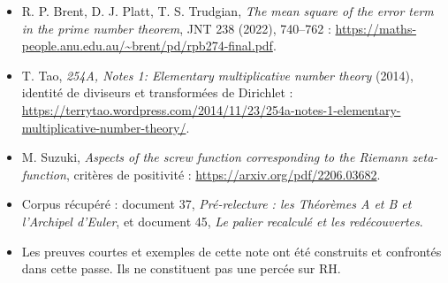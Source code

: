 \documentclass[
  11pt,
]{article}
\providecommand{\tightlist}{%
  \setlength{\itemsep}{0pt}\setlength{\parskip}{0pt}}
\begin{document}
\begin{itemize}
\tightlist
\item
  R. P. Brent, D. J. Platt, T. S. Trudgian, \emph{The mean square of the
  error term in the prime number theorem}, JNT 238 (2022), 740--762 :
  \url{https://maths-people.anu.edu.au/~brent/pd/rpb274-final.pdf}.
\item
  T. Tao, \emph{254A, Notes 1: Elementary multiplicative number theory}
  (2014), identité de diviseurs et transformées de Dirichlet :
  \url{https://terrytao.wordpress.com/2014/11/23/254a-notes-1-elementary-multiplicative-number-theory/}.
\item
  M. Suzuki, \emph{Aspects of the screw function corresponding to the
  Riemann zeta-function}, critères de positivité :
  \url{https://arxiv.org/pdf/2206.03682}.
\item
  Corpus récupéré : document 37, \emph{Pré-relecture : les Théorèmes A
  et B et l'Archipel d'Euler}, et document 45, \emph{Le palier recalculé
  et les redécouvertes}.
\item
  Les preuves courtes et exemples de cette note ont été construits et
  confrontés dans cette passe. Ils ne constituent pas une percée sur RH.
\end{itemize}
\end{document}
